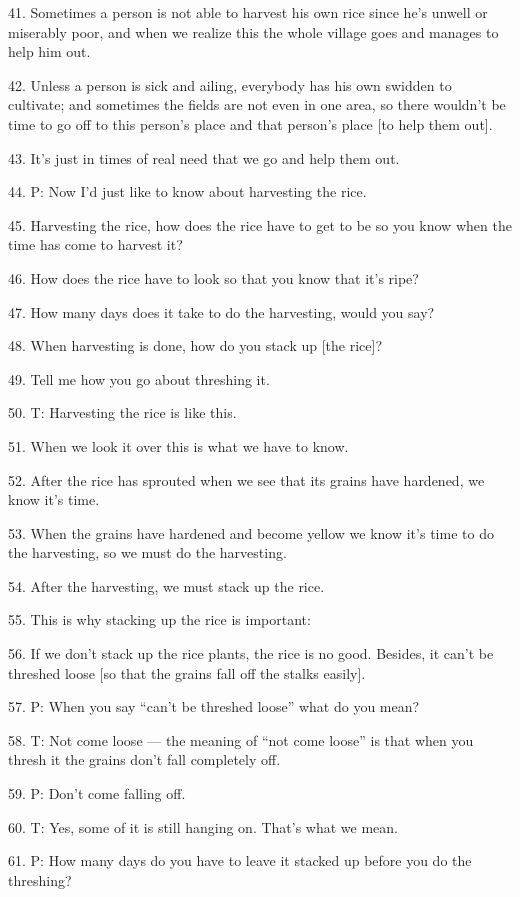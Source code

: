 41. Sometimes a person is not able to harvest his own rice since he's unwell or
miserably poor, and when we realize this the whole village goes and manages to
help him out.

42. Unless a person is sick and ailing, everybody has his own swidden to cultivate;
and sometimes the fields are not even in one area, so there wouldn't be time to
go off to this person's place and that person's place [to help them out].

43. It's just in times of real need that we go and help them out.

44. P: Now I'd just like to know about harvesting the rice.

45. Harvesting the rice, how does the rice have to get to be so you know when the
time has come to harvest it?

46. How does the rice have to look so that you know that it's ripe?

47. How many days does it take to do the harvesting, would you say?

48. When harvesting is done, how do you stack up [the rice]?

49. Tell me how you go about threshing it.

50. T: Harvesting the rice is like this.

51. When we look it over this is what we have to know.

52. After the rice has sprouted when we see that its grains have hardened, we know
it's time.

53. When the grains have hardened and become yellow we know it's time to do the
harvesting, so we must do the harvesting.

54. After the harvesting, we must stack up the rice.

55. This is why stacking up the rice is important:

56. If we don't stack up the rice plants, the rice is no good. Besides, it can't
be threshed loose [so that the grains fall off the stalks easily].

57. P: When you say ``can't be threshed loose'' what do you mean?

58. T: Not come loose --- the meaning of ``not come loose'' is that when you
thresh it the grains don't fall completely off.

59. P: Don't come falling off.

60. T: Yes, some of it is still hanging on. That's what we mean.

61. P: How many days do you have to leave it stacked up before you do the threshing?

